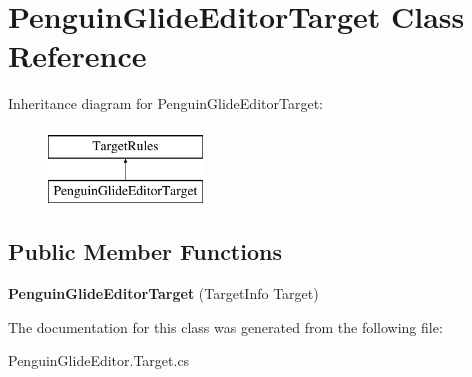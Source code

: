 \hypertarget{class_penguin_glide_editor_target}{}\section{Penguin\+Glide\+Editor\+Target Class Reference}
\label{class_penguin_glide_editor_target}
Inheritance diagram for Penguin\+Glide\+Editor\+Target\+:\begin{figure}[H]
\begin{center}
\leavevmode
\includegraphics[height=2.000000cm]{class_penguin_glide_editor_target}
\end{center}
\end{figure}
\subsection*{Public Member Functions}
\begin{DoxyCompactItemize}
\item 
\mbox{\label{class_penguin_glide_editor_target_a77f2be7f67fe73277cbb4f5de31562b4}} 
{\bfseries Penguin\+Glide\+Editor\+Target} (Target\+Info Target)
\end{DoxyCompactItemize}


The documentation for this class was generated from the following file\+:\begin{DoxyCompactItemize}
\item 
Penguin\+Glide\+Editor.\+Target.\+cs\end{DoxyCompactItemize}
